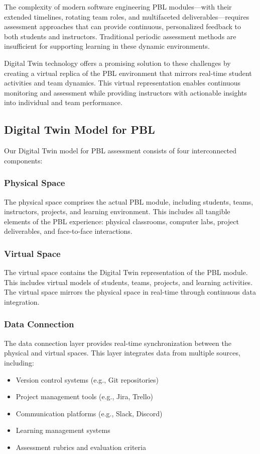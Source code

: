 \documentclass[review]{elsarticle}
\begin{document}
The complexity of modern software engineering PBL modules—with their extended timelines, rotating team roles, and multifaceted deliverables—requires assessment approaches that can provide continuous, personalized feedback to both students and instructors. Traditional periodic assessment methods are insufficient for supporting learning in these dynamic environments.

Digital Twin technology offers a promising solution to these challenges by creating a virtual replica of the PBL environment that mirrors real-time student activities and team dynamics. This virtual representation enables continuous monitoring and assessment while providing instructors with actionable insights into individual and team performance.

\subsection{Digital Twin Model for PBL}
\label{sec:model}

Our Digital Twin model for PBL assessment consists of four interconnected components:

\subsubsection{Physical Space}
The physical space comprises the actual PBL module, including students, teams, instructors, projects, and learning environment. This includes all tangible elements of the PBL experience: physical classrooms, computer labs, project deliverables, and face-to-face interactions.

\subsubsection{Virtual Space}
The virtual space contains the Digital Twin representation of the PBL module. This includes virtual models of students, teams, projects, and learning activities. The virtual space mirrors the physical space in real-time through continuous data integration.

\subsubsection{Data Connection}
The data connection layer provides real-time synchronization between the physical and virtual spaces. This layer integrates data from multiple sources, including:
\begin{itemize}
    \item Version control systems (e.g., Git repositories)
    \item Project management tools (e.g., Jira, Trello)
    \item Communication platforms (e.g., Slack, Discord)
    \item Learning management systems
    \item Assessment rubrics and evaluation criteria
\end{itemize}
\end{document}
